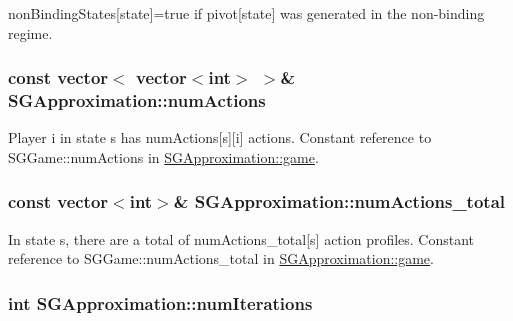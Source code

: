 non\-Binding\-States\mbox{[}state\mbox{]}=true if pivot\mbox{[}state\mbox{]} was generated in the non-\/binding regime. \hypertarget{classSGApproximation_af6ee6afd52c29d6c81f29a4e35c40771}{
\subsubsection[{num\-Actions}]{\setlength{\rightskip}{0pt plus 5cm}const vector$<$ vector$<$int$>$ $>$\& S\-G\-Approximation\-::num\-Actions\hspace{0.3cm}{\ttfamily [private]}}}\label{classSGApproximation_af6ee6afd52c29d6c81f29a4e35c40771}
Player i in state s has num\-Actions\mbox{[}s\mbox{]}\mbox{[}i\mbox{]} actions. Constant reference to S\-G\-Game\-::num\-Actions in \hyperlink{classSGApproximation_a3244a3d7de5f2b909d438f5b4ab337ee}{S\-G\-Approximation\-::game}. \hypertarget{classSGApproximation_abcd0b34194cd55fca5361bb1c6d3a5e3}{
\subsubsection[{num\-Actions\-\_\-total}]{\setlength{\rightskip}{0pt plus 5cm}const vector$<$int$>$\& S\-G\-Approximation\-::num\-Actions\-\_\-total\hspace{0.3cm}{\ttfamily [private]}}}\label{classSGApproximation_abcd0b34194cd55fca5361bb1c6d3a5e3}
In state s, there are a total of num\-Actions\-\_\-total\mbox{[}s\mbox{]} action profiles. Constant reference to S\-G\-Game\-::num\-Actions\-\_\-total in \hyperlink{classSGApproximation_a3244a3d7de5f2b909d438f5b4ab337ee}{S\-G\-Approximation\-::game}. \hypertarget{classSGApproximation_a2898a820d159794c48e5611ee3937ca8}{
\subsubsection[{num\-Iterations}]{\setlength{\rightskip}{0pt plus 5cm}int S\-G\-Approximation\-::num\-Iterations\hspace{0.3cm}{\ttfamily [private]}}}\label{classSGApproximation_a2898a820d159794c48e5611ee3937ca8}
